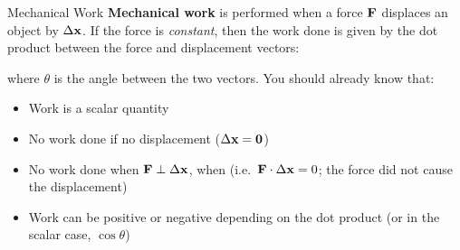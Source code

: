 \documentclass[12pt,compress,aspectratio=169]{beamer}
\newcommand{\mb}[1]{\ensuremath\mathbf{#1}}
\newcommand{\eq}[2]{\vspace{#1}{\Large\begin{displaymath}#2\end{displaymath}}}
\begin{document}
\begin{frame}{Mechanical Work}
  \textbf{Mechanical work} is performed when a force $\mb{F}$ displaces an
  object by $\Delta \mb{x}$. If the force is \emph{constant}, then the work
  done is given by the dot product between the force and displacement vectors:

  \eq{-.2in}{
    \boxed{W=\mb{F}\cdot\Delta\mb{x}}
    \quad\text{\normalsize or}\quad
    \boxed{W=F\Delta x\cos\theta}
  }

  \vspace{-.15in}where $\theta$ is the angle between the two vectors. You should
  already know that:
%
%
  \begin{itemize}
  \item Work is a scalar quantity
  \item No work done if no displacement ($\Delta\mb{x}=\mb{0}$)
  \item No work done when $\mb{F}\perp\Delta\mb{x}$, when (i.e.\
    $\mb{F}\cdot\Delta\mb{x}=0$; the force did not cause the displacement)
  \item Work can be positive or negative depending on the dot product (or in
    the scalar case, $\cos\theta$)
  \end{itemize}
\end{frame}



%
%
%

\end{document}
